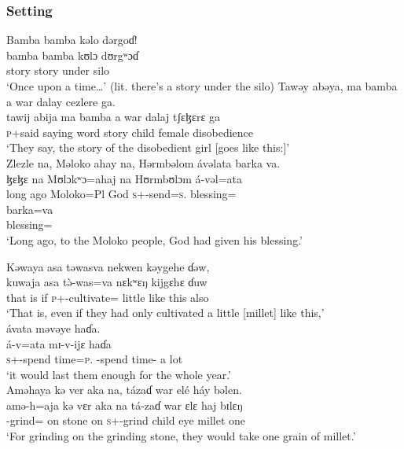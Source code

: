 \subsubsection*{Setting}
\ea Bamba  bamba  kəlo  dərgoɗ!\\
\gll bamba   bamba   kʊlɔ     dʊrgʷɔɗ\\
story        story     under    silo\\
\glt ‘Once upon a time…’ (lit. there’s a story under the silo)
\z
\ea    Tawəy  abəya,  ma  bamba  a  war  dalay  cezlere  ga.\\
\gll tawij  abija    ma   bamba   a       war     dalaj      tʃɛɮɛrɛ        ga\\
\textsc{p}+said  saying   word   story   {\GEN}   child   female  disobedience   {\ADJ}\\
\glt ‘They say, the story of the disobedient girl [goes like this:]’\\
\z
\ea    Zlezle  na,  Məloko  ahay  na,  Hərmbəlom  ávəlata  barka  va.\\
\gll ɮɛɮɛ        na  Mʊlɔkʷɔ=ahaj     na  Hʊrmbʊlɔm  á-vəl=ata     \\   
{long ago}         {\PSP}  Moloko=Pl          {\PSP}  God       \textsc{s}+{\IFV}-send=\textsc{s}.{\IO}   blessing={\PRF} \\ 

\medskip
 \gll barka=va\\
 blessing={\PRF}\\
 \glt ‘Long ago, to the Moloko people, God had given his blessing.’\\
\z

\clearpage
\ea Kəwaya  asa  təwasva  nekwen  kəygehe  ɗəw,\\
\gll kuwaja   asa    t\`ə-was=va  nɛkʷɛŋ    kijgɛhɛ     ɗuw\\
{that is}   if     \textsc{p}+{\PFV}-cultivate={\PRF}  little       {like this}    also\\
\glt ‘That is, even if they had only cultivated a little [millet] like this,’\\

\medskip
 ávata  məvəye  haɗa.  \\
\gll á-v=ata  mɪ-v-ijɛ         haɗa\\
\textsc{s}+{\IFV}-{spend time}=\textsc{p}.{\IO}   {\NOM}-{spend time}-{\CL}  {a lot}\\
\glt ‘it would last them enough for the whole year.’  \\
\z
\ea    Aməhaya  kə  ver  aka  na,  tázaɗ  war  elé  háy  bəlen.\\
\gll amə-h=aja   kə   vɛr   aka  na  tá-zaɗ       war   ɛlɛ  haj  bɪlɛŋ\\
{\DEP}-grind={\PLU}  on   stone   on    {\PSP}  \textsc{s}+{\IFV}-grind  child   eye   millet    one\\
\glt ‘For grinding on the grinding stone, they would take one grain of millet.’\\
\z

